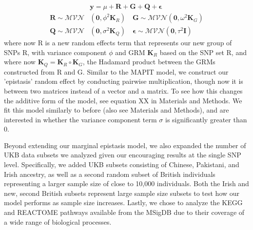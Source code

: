 \documentclass[12pt,a4paper]{article}
\begin{document}
\begin{align}
    & \textbf{y} = \mu + \textbf{R} + \textbf{G} + \textbf{Q} + \boldsymbol{\epsilon} \\
    \textbf{R} \sim \mathcal{MVN}&(\textbf{0}, \phi^{2}\textbf{K}_R) \quad \textbf{G} \sim \mathcal{MVN}(\textbf{0}, \omega^{2}\textbf{K}_G) \nonumber \\ 
    \textbf{Q} \sim \mathcal{MVN}&(\textbf{0}, \sigma^{2}\textbf{K}_Q) \quad \boldsymbol{\epsilon} \sim \mathcal{MVN}(\textbf{0}, \tau^{2}\textbf{I}) \nonumber 
\end{align}
where now R is a new random effects term that represents our new group of SNPs R, with variance component $\phi$ and GRM $\textbf{K}_R$ based on the SNP set R, and where now $\textbf{K}_Q = \textbf{K}_R \circ \textbf{K}_G$, the Hadamard product between the GRMs constructed from R and G. Similar to the MAPIT model, we construct our 'epistasis' random effect by conducting pairwise multiplication, though now it is between two matrices instead of a vector and a matrix. To see how this changes the additive form of the model, see equation XX in Materials and Methods. We fit this model similarly to before (also see Materials and Methods), and are interested in whether the variance component term $\sigma$ is significantly greater than 0.


Beyond extending our marginal epistasis model, we also expanded the number of UKB data subsets we analyzed given our encouraging results at the single SNP level. Specifically, we added UKB subsets consisting of Chinese, Pakistani, and Irish ancestry, as well as a second random subset of British individuals representing a larger sample size of close to 10,000 individuals. Both the Irish and new, second British subsets represent large sample size subsets to test how our model performs as sample size increases. Lastly, we chose to analyze the KEGG and REACTOME pathways available from the MSigDB \citep{Liberzon2011} due to their coverage of a wide range of biological processes. 

\fi
\end{document}
